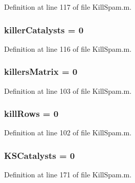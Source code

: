 Definition at line 117 of file Kill\+Spam.\+m.

\hypertarget{a00029_a1a42aaee01b2cc37a3835e0fe30cf9d3}{
\subsubsection[{killer\+Catalysts}]{\setlength{\rightskip}{0pt plus 5cm}killer\+Catalysts = 0}}\label{a00029_a1a42aaee01b2cc37a3835e0fe30cf9d3}


Definition at line 116 of file Kill\+Spam.\+m.

\hypertarget{a00029_a929016802e1ede2217a41240a6974fa6}{
\subsubsection[{killers\+Matrix}]{\setlength{\rightskip}{0pt plus 5cm}killers\+Matrix = 0}}\label{a00029_a929016802e1ede2217a41240a6974fa6}


Definition at line 103 of file Kill\+Spam.\+m.

\hypertarget{a00029_a747bc1d10158c78e88e314825ed41a13}{
\subsubsection[{kill\+Rows}]{ kill\+Rows = 0}}\label{a00029_a747bc1d10158c78e88e314825ed41a13}


Definition at line 102 of file Kill\+Spam.\+m.

\hypertarget{a00029_a25c085d4378366ed81f0f97547802c8f}{
\subsubsection[{K\+S\+Catalysts}]{\setlength{\rightskip}{0pt plus 5cm}K\+S\+Catalysts = 0}}\label{a00029_a25c085d4378366ed81f0f97547802c8f}


Definition at line 171 of file Kill\+Spam.\+m.

